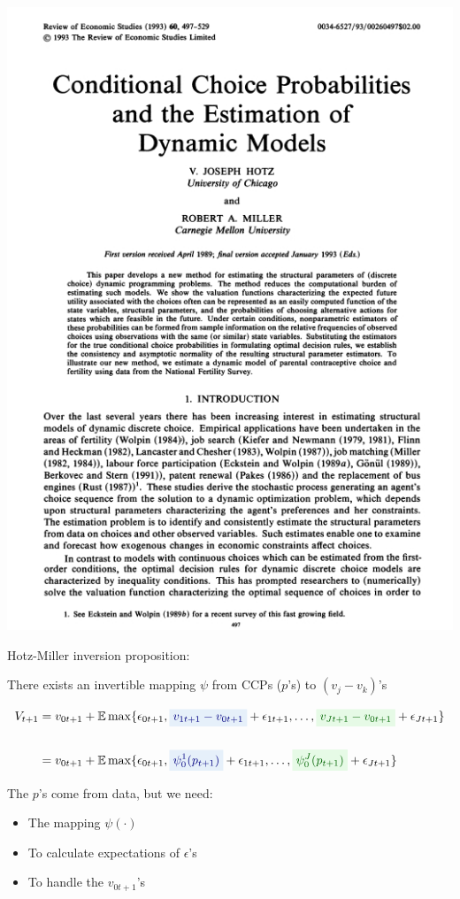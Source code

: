 \documentclass[aspectratio=169]{beamer}
\newcommand{\highlight}[1]{\colorbox{lightblue}{$\displaystyle\textcolor{navy}{#1}$}}
\newcommand{\highlightgreen}[1]{\colorbox{lightgreen}{$\displaystyle\textcolor{darkgreen}{#1}$}}
\begin{document}
\begin{frame}
\centering
\includegraphics[width=.42\textwidth]{HotzMiller_cover.jpg}
\end{frame}



\begin{frame}

Hotz-Miller inversion proposition: 
\bigskip\par

There exists an invertible mapping $\psi$ from CCPs ($p$'s) to $(v_j - v_k)$'s

\begin{align*}
V_{t+1}&= v_{0t+1} + \mathbb{E}\max\{\epsilon_{0t+1}, \highlight{v_{1t+1} - v_{0t+1}} + \epsilon_{1t+1}, \ldots, \highlightgreen{v_{Jt+1} - v_{0t+1}} + \epsilon_{Jt+1}\}\\[1.5em]
&= v_{0t+1} + \mathbb{E}\max\{\epsilon_{0t+1}, \highlight{\psi_0^1(p_{t+1})} + \epsilon_{1t+1}, \ldots, \highlightgreen{\psi_0^J(p_{t+1})} + \epsilon_{Jt+1}\}
\end{align*}

\end{frame}



\begin{frame}
The $p$'s come from data, but we need:
\bigskip\par
\begin{itemize}
\itemsep1.5em
\item<2-> The mapping $\psi\left(\cdot\right)$
\item<3-> To calculate expectations of $\epsilon$'s
\item<4-> To handle the $v_{0t+1}$'s
\end{itemize}




\end{frame}
\end{document}
